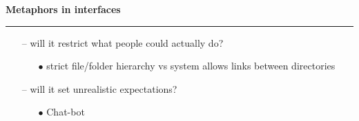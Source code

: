\documentclass[pdf]{beamer}
\begin{document}
\begin{frame}
{\textbf{Metaphors in interfaces}}{\textcolor{red}{\rule{12cm}{1.2pt}}}

    \vspace{10px}
     \begin{itemize}
      \item[--] {will it restrict what people could actually do?}
       \begin{itemize}
       	\item[{$\bullet$}] {strict file/folder hierarchy \newline vs \newline system allows links between directories}
       \end{itemize}
       \vspace{10px}
      \item[--] {will it set unrealistic expectations?}
       \begin{itemize}
       	\item[{$\bullet$}] {Chat-bot}
       \end{itemize}
     \end{itemize}
     
     \vspace{60px}
	 \hspace{260px}\fontsize{2pt}{1pt}
    
\end{frame}
\end{document}
